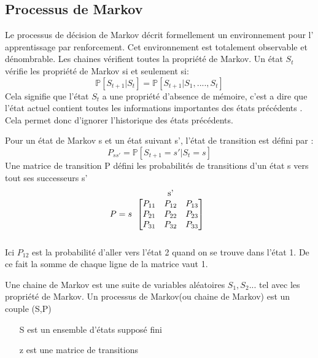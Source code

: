 \documentclass[a4paper,10pt]{article}
\begin{document}
\subsection{Processus de Markov}
Le processus de décision de Markov décrit formellement un environnement pour l' apprentissage par renforcement. Cet environnement est totalement observable et dénombrable.
Les chaines vérifient toutes la propriété de Markov. Un état $S_t$ vérifie les propriété de Markov si et seulement si:
\[\mathbb{P}[S_{t+1}|S_t]=\mathbb{P}[S_{t+1}|S_1,....,S_t]\]
Cela signifie que l'état $S_t$ a  une propriété d'absence de mémoire, c'est a dire que l'état actuel contient toutes les informations importantes des états précédents . Cela permet donc d'ignorer l'historique des états précédents.
\par
Pour un état de Markov s et un état suivant s', l'état de transition est défini par : \[P_{ss'}=\mathbb{P}[S_{t+1}=s'|S_t=s]\]
Une matrice de transition P défini les probabilités de transitions d'un état s vers tout ses successeurs s' \[P = s
\begin{tabular}{c}
 s'\\
$$$\begin{bmatrix}
P_{11} & P_{12} & P_{13} \\
P_{21} & P_{22} & P_{23} \\
P_{31} & P_{32} & P_{33}
\end{bmatrix}$$$\\
\\
\end{tabular}\]
Ici $P_{12}$ est la probabilité d'aller vers l'état 2 quand on se trouve dans l'état 1. De ce fait la somme de chaque ligne de la matrice vaut 1.\par
Une chaine de Markov est une suite de variables aléatoires $S_1,S_2$... tel avec les propriété de Markov. Un processus de Markov(ou chaine de Markov) est un couple (S,P)
\begin{itemize}
\item[S] est un ensemble d'états supposé fini
\item[z] est une matrice de transitions 
\end{itemize}
\end{document}
